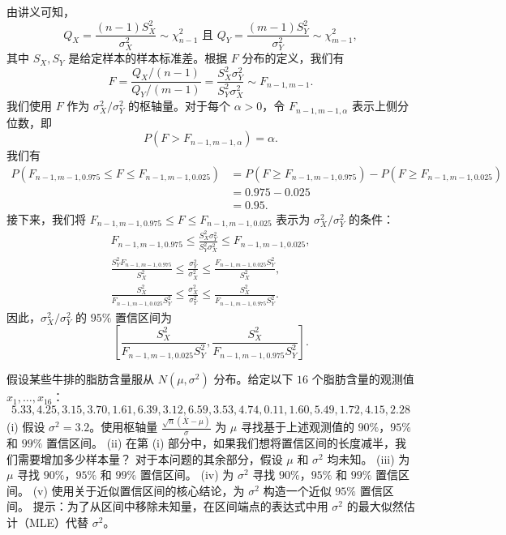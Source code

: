 \begin{questions}
\begin{solution}
由讲义可知，
\[
Q_X = \frac{(n-1)S_X^2}{\sigma_X^2} \sim \chi_{n-1}^2 \text{ 且 } Q_Y = \frac{(m-1)S_Y^2}{\sigma_Y^2} \sim \chi_{m-1}^2,
\]
其中 $S_X, S_Y$ 是给定样本的样本标准差。根据 $F$ 分布的定义，我们有
\[
F = \frac{Q_X / (n-1)}{Q_Y / (m-1)} = \frac{S_X^2 \sigma_Y^2}{S_Y^2 \sigma_X^2} \sim F_{n-1, m-1}.
\]
我们使用 $F$ 作为 $\sigma_X^2 / \sigma_Y^2$ 的枢轴量。对于每个 $\alpha > 0$，令 $F_{n-1, m-1, \alpha}$ 表示上侧分位数，即
\[
P(F > F_{n-1, m-1, \alpha}) = \alpha.
\]
我们有
\begin{align*}
P(F_{n-1, m-1, 0.975} \le F \le F_{n-1, m-1, 0.025}) &= P(F \ge F_{n-1, m-1, 0.975}) - P(F \ge F_{n-1, m-1, 0.025}) \\
&= 0.975 - 0.025 \\
&= 0.95.
\end{align*}
接下来，我们将 $F_{n-1, m-1, 0.975} \le F \le F_{n-1, m-1, 0.025}$ 表示为 $\sigma_X^2 / \sigma_Y^2$ 的条件：
\begin{align*}
F_{n-1, m-1, 0.975} \le \frac{S_X^2 \sigma_Y^2}{S_Y^2 \sigma_X^2} \le F_{n-1, m-1, 0.025}, \\
\frac{S_Y^2 F_{n-1, m-1, 0.975}}{S_X^2} \le \frac{\sigma_Y^2}{\sigma_X^2} \le \frac{F_{n-1, m-1, 0.025} S_Y^2}{S_X^2}, \\
\frac{S_X^2}{F_{n-1, m-1, 0.025} S_Y^2} \le \frac{\sigma_X^2}{\sigma_Y^2} \le \frac{S_X^2}{F_{n-1, m-1, 0.975} S_Y^2}.
\end{align*}
因此，$\sigma_X^2 / \sigma_Y^2$ 的 $95\%$ 置信区间为
\[
\left[ \frac{S_X^2}{F_{n-1, m-1, 0.025} S_Y^2}, \frac{S_X^2}{F_{n-1, m-1, 0.975} S_Y^2} \right].
\]
\end{solution}

\question 假设某些牛排的脂肪含量服从 $N(\mu, \sigma^2)$ 分布。给定以下 $16$ 个脂肪含量的观测值 $x_1, \dots, x_{16}$：
\[
5.33, 4.25, 3.15, 3.70, 1.61, 6.39, 3.12, 6.59, 3.53, 4.74, 0.11, 1.60, 5.49, 1.72, 4.15, 2.28
\]
(i) 假设 $\sigma^2 = 3.2$。使用枢轴量 $\frac{\sqrt{n}(\bar{X} - \mu)}{\sigma}$ 为 $\mu$ 寻找基于上述观测值的 $90\%$，$95\%$ 和 $99\%$ 置信区间。
(ii) 在第 (i) 部分中，如果我们想将置信区间的长度减半，我们需要增加多少样本量？
对于本问题的其余部分，假设 $\mu$ 和 $\sigma^2$ 均未知。
(iii) 为 $\mu$ 寻找 $90\%$，$95\%$ 和 $99\%$ 置信区间。
(iv) 为 $\sigma^2$ 寻找 $90\%$，$95\%$ 和 $99\%$ 置信区间。
(v) 使用关于近似置信区间的核心结论，为 $\sigma^2$ 构造一个近似 $95\%$ 置信区间。
提示：为了从区间中移除未知量，在区间端点的表达式中用 $\sigma^2$ 的最大似然估计（MLE）代替 $\sigma^2$。


\end{questions}
